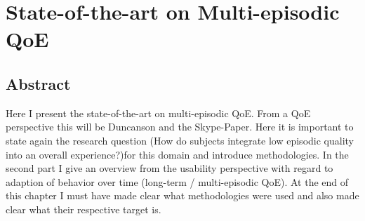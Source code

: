 \chapter{State-of-the-art on Multi-episodic QoE}\label{chap:05}
\section*{Abstract}
Here I present the state-of-the-art on multi-episodic QoE.
From a QoE perspective this will be Duncanson and the Skype-Paper.
Here it is important to state again the research question (How do subjects integrate low episodic quality into an overall experience?)for this domain and introduce methodologies.
In the second part I give an overview from the usability perspective with regard to adaption of behavior over time (long-term / multi-episodic QoE).
At the end of this chapter I must have made clear what methodologies were used and also made clear what their respective target is.